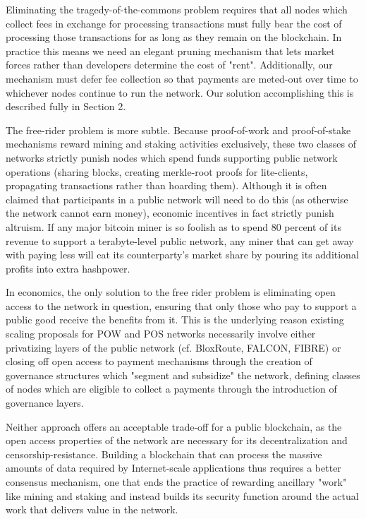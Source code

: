 \documentclass[11.5pt, oneside]{article}   	%
\begin{document}
\begin{multicols}{2}
Eliminating the tragedy-of-the-commons problem requires that all nodes which collect fees in exchange for processing transactions must fully bear the cost of processing those transactions for as long as they remain on the blockchain. In practice this means we need an elegant pruning mechanism that lets market forces rather than developers determine the cost of "rent". Additionally, our mechanism must defer fee collection so that payments are meted-out over time to whichever nodes continue to run the network. Our solution accomplishing this is described fully in Section 2.

The free-rider problem is more subtle. Because proof-of-work and proof-of-stake mechanisms reward mining and staking activities exclusively, these two classes of networks strictly punish nodes which spend funds supporting public network operations (sharing blocks, creating merkle-root proofs for lite-clients, propagating transactions rather than hoarding them).  Although it is often claimed that participants in a public network will need to do this (as otherwise the network cannot earn money), economic incentives in fact strictly punish altruism. If any major bitcoin miner is so foolish as to spend 80 percent of its revenue to support a terabyte-level public network, any miner that can get away with paying less will eat its counterparty's market share by pouring its additional profits into extra hashpower.

In economics, the only solution to the free rider problem is eliminating open access to the network in question, ensuring that only those who pay to support a public good receive the benefits from it. This is the underlying reason existing scaling proposals for POW and POS networks necessarily involve either privatizing layers of the public network (cf. BloxRoute, FALCON, FIBRE) or closing off open access to payment mechanisms through the creation of governance structures which "segment and subsidize" the network, defining classes of nodes which are eligible to collect a payments through the introduction of governance layers.

Neither approach offers an acceptable trade-off for a public blockchain, as the open access properties of the network are necessary for its decentralization and censorship-resistance. Building a blockchain that can process the massive amounts of data required by Internet-scale applications thus requires a better consensus mechanism, one that ends the practice of rewarding ancillary "work" like mining and staking and instead builds its security function around the actual work that delivers value in the network. 


\end{multicols}
\end{document}
